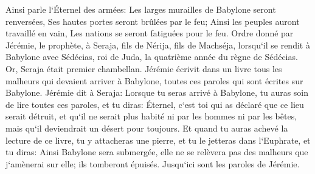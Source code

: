 \verse Ainsi parle l`Éternel des armées: Les larges murailles de Babylone seront renversées, Ses hautes portes seront brûlées par le feu; Ainsi les peuples auront travaillé en vain, Les nations se seront fatiguées pour le feu. 
\verse Ordre donné par Jérémie, le prophète, à Seraja, fils de Nérija, fils de Machséja, lorsqu`il se rendit à Babylone avec Sédécias, roi de Juda, la quatrième année du règne de Sédécias. Or, Seraja était premier chambellan. 
\verse Jérémie écrivit dans un livre tous les malheurs qui devaient arriver à Babylone, toutes ces paroles qui sont écrites sur Babylone. 
\verse Jérémie dit à Seraja: Lorsque tu seras arrivé à Babylone, tu auras soin de lire toutes ces paroles, 
\verse et tu diras: Éternel, c`est toi qui as déclaré que ce lieu serait détruit, et qu`il ne serait plus habité ni par les hommes ni par les bêtes, mais qu`il deviendrait un désert pour toujours. 
\verse Et quand tu auras achevé la lecture de ce livre, tu y attacheras une pierre, et tu le jetteras dans l`Euphrate, 
\verse et tu diras: Ainsi Babylone sera submergée, elle ne se relèvera pas des malheurs que j`amènerai sur elle; ils tomberont épuisés. Jusqu`ici sont les paroles de Jérémie. 

\chapter{}


